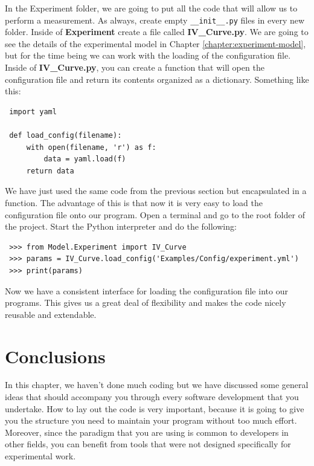 In the Experiment folder, we are going to put all the code that will allow us to perform a measurement. As always, create empty \texttt{\_\_init\_\_.py} files in every new folder. Inside of \textbf{Experiment} create a file called \textbf{IV\_Curve.py}. We are going to see the details of the experimental model in Chapter \ref{chapter:experiment-model}, but for the time being we can work with the loading of the configuration file. Inside of \textbf{IV\_Curve.py}, you can create a function that will open the configuration file and return its contents organized as a dictionary. Something like this:

\begin{verbatim}
 import yaml
 
 def load_config(filename):
     with open(filename, 'r') as f:
         data = yaml.load(f)
     return data
\end{verbatim}

We have just used the same code from the previous section but encapsulated in a function. The advantage of this is that now it is very easy to load the configuration file onto our program. Open a terminal and go to the root folder of the project. Start the Python interpreter and do the following:

\begin{verbatim}
 >>> from Model.Experiment import IV_Curve
 >>> params = IV_Curve.load_config('Examples/Config/experiment.yml')
 >>> print(params)
\end{verbatim}

Now we have a consistent interface for loading the configuration file into our programs. This gives us a great deal of flexibility and makes the code nicely reusable and extendable. 


\section{Conclusions}\label{section:layout-conclusions}
In this chapter, we haven't done much coding but we have discussed some general ideas that should accompany you through every software
development that you undertake. How to lay out the code is very important, because it is going to give you the structure you need to
maintain your program without too much effort. Moreover, since the paradigm that you are using is common to developers in other fields, you can benefit from tools that were not designed specifically for experimental work.

